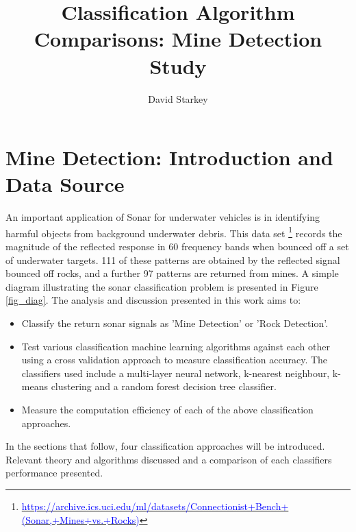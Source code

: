 \documentclass[10pt]{article}
\begin{document}
\title{Classification Algorithm Comparisons: Mine Detection Study}

\author{David Starkey}

\maketitle





\section{Mine Detection: Introduction and Data Source}

An important application of Sonar for underwater vehicles is in identifying harmful objects from background underwater debris. This data set \footnote{\href{ https://archive.ics.uci.edu/ml/datasets/Connectionist+Bench+(Sonar,+Mines+vs.+Rocks)}{\textcolor{blue}{https://archive.ics.uci.edu/ml/datasets/Connectionist+Bench+(Sonar,+Mines+vs.+Rocks)}}} records the magnitude of the reflected response in 60 frequency bands when bounced off a set of underwater targets. 111 of these patterns are obtained by the reflected signal bounced off rocks, and a further 97 patterns are returned from mines. A simple diagram illustrating the sonar classification problem is presented in Figure \ref{fig_diag}. The analysis and discussion presented in this work aims to:

\begin{itemize}
\item Classify the return sonar signals as 'Mine Detection' or 'Rock Detection'.

\item Test various classification machine learning algorithms against each other using a cross validation approach to measure classification accuracy. The classifiers used include a multi-layer neural network, k-nearest neighbour, k-means clustering and a random forest decision tree classifier.

\item Measure the computation efficiency of each of the above classification approaches.

\end{itemize}


In the sections that follow, four classification approaches will be introduced. Relevant theory and algorithms discussed and a comparison of each classifiers performance presented.
\end{document}
